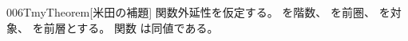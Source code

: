 \documentclass[index]{subfiles}
\begin{document}
\begin{myBlock}{006T}{myTheorem}[米田の補題]
  関数外延性を仮定する。
  を階数、
  を前圏、
  を対象、
  を前層とする。
  関数
  は同値である。
\end{myBlock}
\end{document}
